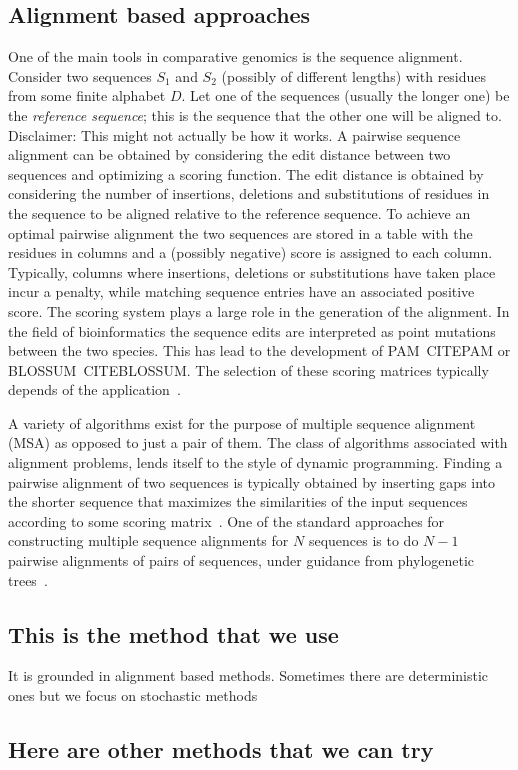         \subsection{Alignment based approaches}
            One of the main tools in comparative genomics is the sequence alignment. 
            Consider two sequences $S_1$ and $S_2$ (possibly of different lengths) with residues from some finite alphabet $D$. Let one of the sequences (usually the longer one) be the \emph{reference sequence}; this is the sequence that the other one will be aligned to. 
            {\color{red}Disclaimer: This might not actually be how it works.}
            A pairwise sequence alignment can be obtained by considering the edit distance between two sequences and optimizing a scoring function. The edit distance is obtained by considering the number of insertions, deletions and substitutions of residues in the sequence to be aligned relative to the reference sequence. To achieve an optimal pairwise alignment the two sequences are stored in a table with the residues in columns and a (possibly negative) score is assigned to each column. Typically, columns where insertions, deletions or substitutions have taken place incur a penalty, while matching sequence entries have an associated positive score. The scoring system plays a large role in the generation of the alignment. In the field of bioinformatics the sequence edits are interpreted as point mutations between the two species. This has lead to the development of PAM~CITEPAM or BLOSSUM~CITEBLOSSUM. The selection of these scoring matrices typically depends of the application~\cite{mount2008comparison}.

            A variety of algorithms exist for the purpose of multiple sequence alignment (MSA) as opposed to just a pair of them. The class of algorithms associated with alignment problems, lends itself to the style of dynamic programming. Finding a pairwise alignment of two sequences is typically obtained by inserting gaps into the shorter sequence that maximizes the similarities of the input sequences according to some scoring matrix~\cite{edgar2006multiple}. One of the standard approaches for constructing multiple sequence alignments for $N$ sequences is to do $N-1$ pairwise alignments of pairs of sequences, under guidance from phylogenetic trees~\cite{feng1987progressive}.
        \subsection{This is the method that we use}
            It is grounded in alignment based methods.
            Sometimes there are deterministic ones but we focus on stochastic methods
        \subsection{Here are other methods that we can try}